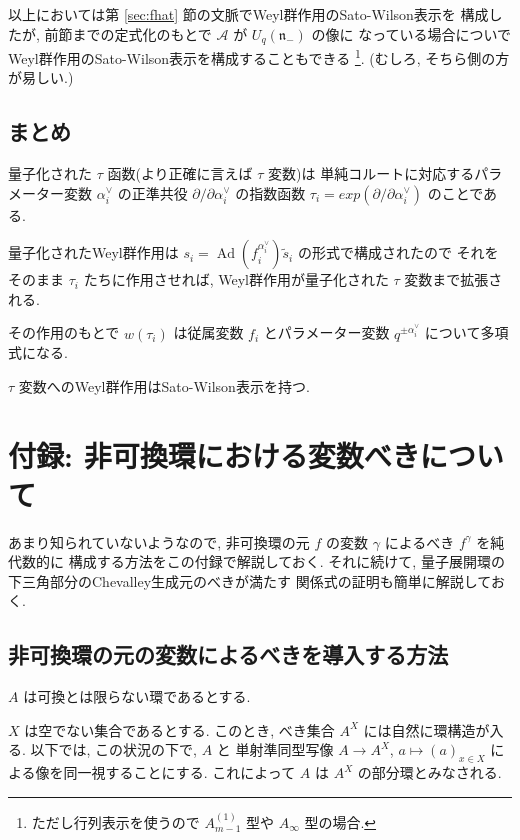 \documentclass[12pt,twoside,dvipdfm]{msjproc}
\theoremstyle{definition} %
\theoremstyle{definition} %
\theoremstyle{definition} %
\numberwithin{theorem}{section}
\numberwithin{equation}{section}
\numberwithin{figure}{section}
\numberwithin{table}{section}
\newcommand\secref[1]{第 \ref{#1} 節}
\newcommand\nil{\mathfrak{n}}
\newcommand\A{\mathcal{A}}
\newcommand\Ad{\mathop{\mathrm{Ad}}\nolimits}
\newcommand\ts{{\tilde{s}}}
\newcommand\av{\alpha^\vee}
\begin{document}
以上においては\secref{sec:fhat}の文脈でWeyl群作用のSato-Wilson表示を
構成したが, 前節までの定式化のもとで $\A$ が $U_q(\nil_-)$ の像に
なっている場合についでWeyl群作用のSato-Wilson表示を構成することもできる%
\footnote{ただし行列表示を使うので $A^{(1)}_{m-1}$ 型や $A_\infty$ 型の場合.}.
(むしろ, そちら側の方が易しい.) 



\subsection{まとめ}

量子化された $\tau$ 函数(より正確に言えば $\tau$ 変数)は
単純コルートに対応するパラメーター変数 $\av_i$ の正準共役 $\partial/\partial\av_i$
の指数函数 $\tau_i=exp(\partial/\partial\av_i)$ のことである.

量子化されたWeyl群作用は $s_i=\Ad(f_i^{\av_i})\ts_i$ の形式で構成されたので
それをそのまま $\tau_i$ たちに作用させれば, Weyl群作用が量子化された $\tau$ 
変数まで拡張される.

その作用のもとで $w(\tau_i)$ は従属変数 $f_i$ とパラメーター変数 $q^{\pm\av_i}$ 
について多項式になる.

$\tau$ 変数へのWeyl群作用はSato-Wilson表示を持つ.



\section{付録: 非可換環における変数べきについて}

あまり知られていないようなので, 
非可換環の元 $f$ の変数 $\gamma$ によるべき $f^\gamma$ を純代数的に
構成する方法をこの付録で解説しておく.
それに続けて, 量子展開環の下三角部分のChevalley生成元のべきが満たす
関係式の証明も簡単に解説しておく.


\subsection{非可換環の元の変数によるべきを導入する方法}
\label{sec:powers1}

$A$ は可換とは限らない環であるとする.

$X$ は空でない集合であるとする.
このとき, べき集合 $A^X$ には自然に環構造が入る.
以下では, この状況の下で, $A$ と
単射準同型写像 $A\to A^X$, $a\mapsto (a)_{x\in X}$ による像を同一視することにする.
これによって $A$ は $A^X$ の部分環とみなされる.
\end{document}
